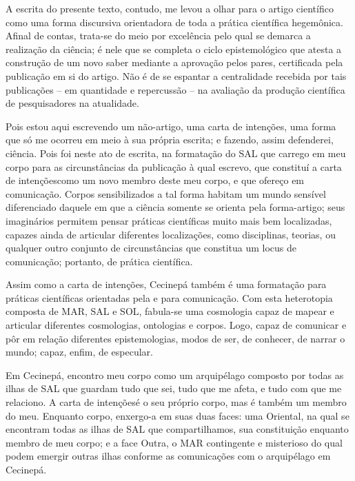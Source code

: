 A escrita do presente texto, contudo, me levou a olhar para o artigo científico como uma forma discursiva orientadora de toda a prática científica hegemônica. Afinal de contas, trata-se do meio por excelência pelo qual se demarca a realização da ciência; é nele que se completa o ciclo epistemológico que atesta a construção de um novo saber mediante a aprovação pelos pares, certificada pela publicação em si do artigo. Não é de se espantar a centralidade recebida por tais publicações -- em quantidade e repercussão -- na avaliação da produção científica de pesquisadores na atualidade.

Pois estou aqui escrevendo um não-artigo, uma carta de intenções, uma forma que só me ocorreu em meio à sua própria escrita; e fazendo, assim defenderei, ciência. Pois foi neste ato de escrita, na formatação do SAL que carrego em meu corpo para as circunstâncias da publicação à qual escrevo, que constituí a \guillemetleft carta de intenções\guillemetright como um novo membro deste meu corpo, e que ofereço em comunicação. Corpos sensibilizados a tal forma habitam um mundo sensível diferenciado daquele em que a ciência somente se orienta pela forma-artigo; seus imaginários permitem pensar práticas científicas muito mais bem localizadas, capazes ainda de articular diferentes localizações, como disciplinas, teorias, ou qualquer outro conjunto de circunstâncias que constitua um locus de comunicação; portanto, de prática científica.

Assim como a carta de intenções, Cecinepá também é uma formatação para práticas científicas orientadas pela e para comunicação. Com esta heterotopia composta de MAR, SAL e SOL, fabula-se uma cosmologia capaz de mapear e articular diferentes cosmologias, ontologias e corpos. Logo, capaz de comunicar e pôr em relação diferentes epistemologias, modos de ser, de conhecer, de narrar o mundo; capaz, enfim, de especular.

Em Cecinepá, encontro meu corpo como um arquipélago composto por todas as ilhas de SAL que guardam tudo que sei, tudo que me afeta, e tudo com que me relaciono. A \guillemetleft carta de intenções\guillemetright é o seu próprio corpo, mas é também um membro do meu. Enquanto corpo, enxergo-a em suas duas faces: uma Oriental, na qual se encontram todas as ilhas de SAL que compartilhamos, sua constituição enquanto membro de meu corpo; e a face Outra, o MAR contingente e misterioso do qual podem emergir outras ilhas conforme as comunicações com o arquipélago em Cecinepá.

